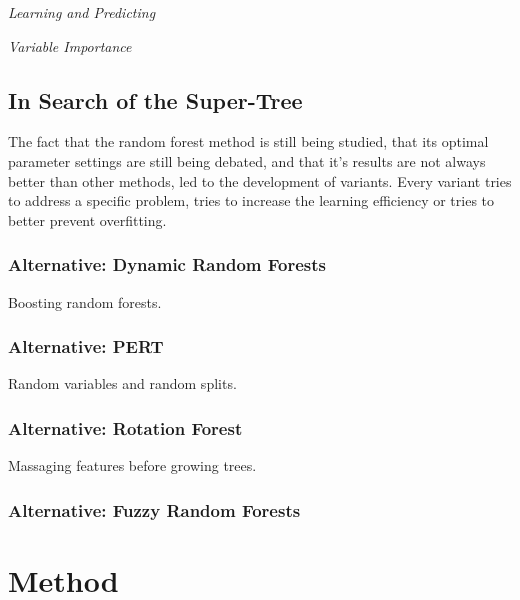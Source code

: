 \documentclass[a4paper,man,12pt,apacite]{apa6} %
\begin{document}
\emph{Learning and Predicting}

\emph{Variable Importance}

\subsection{In Search of the Super-Tree}
The fact that the random forest method is still being studied, that its
optimal parameter settings are still being debated, and that it's results
are not always better than other methods, led to the development of
variants.
Every variant tries to address a specific problem, tries to increase the
learning efficiency or tries to better prevent overfitting.

\subsubsection{Alternative: Dynamic Random Forests}
Boosting random forests.

\subsubsection{Alternative: PERT}
Random variables and random splits.

\subsubsection{Alternative: Rotation Forest}
Massaging features before growing trees.

\subsubsection{Alternative: Fuzzy Random Forests}

\section{Method}
\end{document}
